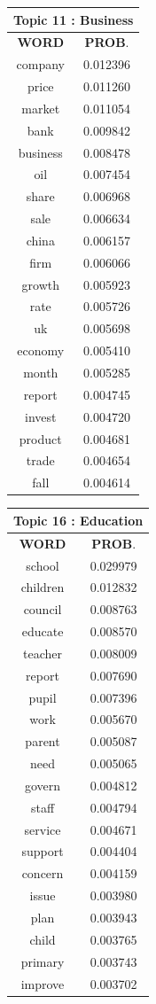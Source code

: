 \begin{table}[h!]
\begin{tabular}{|c c|}
 \end{tabular}
 \hfill
 \begin{tabular}{|c c|} 
\hline
\multicolumn{2}{|c|}{\textbf{Topic 11 : Business}} \\
\hline
 \textbf{WORD} & \textbf{PROB}.  \\ [0.3ex] 
 \hline
 company  & 0.012396 \\
	price  &  0.011260\\
	market &   0.011054\\
	bank  &  0.009842\\
	business &   0.008478\\
	oil  &  0.007454\\
	share &   0.006968\\
	sale &   0.006634\\
	china &   0.006157\\
	firm  &  0.006066\\
	growth &   0.005923\\
	rate &   0.005726\\
	uk  &  0.005698\\
	economy &   0.005410\\
	month  &  0.005285\\
	report &   0.004745\\
	invest &   0.004720\\
	product &   0.004681\\
	trade &   0.004654 \\
	fall  & 0.004614 \\[1ex] 
 \hline
  
 \end{tabular}
 \hfill
 \begin{tabular}{|c c|} 
\hline
\multicolumn{2}{|c|}{\textbf{Topic 16 : Education}} \\
\hline
 \textbf{WORD} & \textbf{PROB}.  \\ [0.3ex] 
 \hline
 school  & 0.029979 \\
	children   &  0.012832 \\
	council    & 0.008763 \\
	educate    & 0.008570 \\
	teacher   &  0.008009 \\
	report   &  0.007690 \\
	pupil   &  0.007396 \\
	work   &  0.005670 \\
	parent   &  0.005087 \\
	need   &  0.005065 \\
	govern    & 0.004812 \\
	staff   &  0.004794 \\
	service  &  0.004671 \\
	support   &  0.004404 \\
	concern   &  0.004159 \\
	issue    & 0.003980 \\
	plan    & 0.003943 \\
	child   &  0.003765 \\
	primary   &  0.003743 \\
	improve   & 0.003702 \\ [1ex] 
 \hline
  

\end{tabular}
\end{table}
